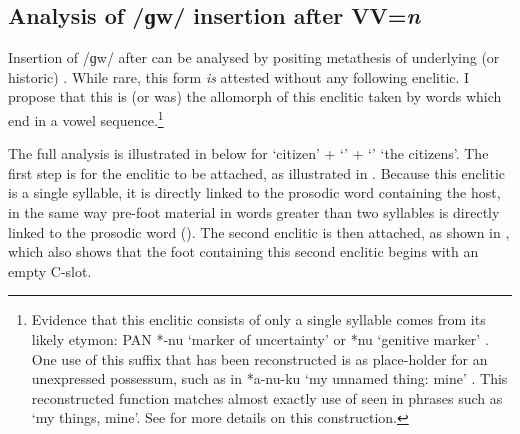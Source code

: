 \subsection{Analysis of /ɡw/ insertion after VV=\it{n}}\label{sec:AnaGwInsVVn}
Insertion of /ɡw/ after  can be analysed by positing
metathesis of underlying (or historic) .
While rare, this form \emph{is} attested without any following enclitic.
I propose that this is (or was) the allomorph of this enclitic taken by
words which end in a vowel sequence.\footnote{
		Evidence that this enclitic consists of only a single syllable
		comes from its likely etymon:
		PAN *-nu `marker of uncertainty' \citep{bltr}
		or *nu `genitive marker' \citep[914]{wo10}.
		One use of this suffix that has been reconstructed
		is as place-holder for an unexpressed possessum,
		such as in *a-nu-ku `my unnamed thing: mine' \citep{bltr}.
		This reconstructed function matches almost exactly use of 
		seen in phrases such as  `my things, mine'.
		See  for more details on this construction.}

The full analysis is illustrated in  below for
 `citizen' +  `{\ein}' +  `{\ii}' {\ra}  `the citizens'.
The first step is for the enclitic  to be attached,
as illustrated in .
Because this enclitic is a single syllable,
it is directly linked to the prosodic word containing the host,
in the same way pre-foot material in words greater than two syllables
is directly linked to the prosodic word ().
The second enclitic is then attached,
as shown in , which also shows that the
foot containing this second enclitic begins with an empty C-slot.

